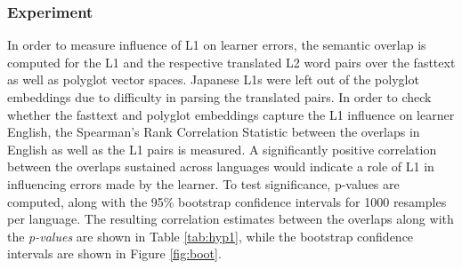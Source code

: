 \documentclass[10pt,letterpaper]{article}
\begin{document}
\subsubsection{Experiment} In order to measure influence of L1 on learner errors, the semantic overlap is computed for the L1 and the respective translated L2 word pairs over the fasttext as well as polyglot vector spaces. Japanese L1s were left out of the polyglot embeddings due to difficulty in parsing the translated pairs. In order to check whether the fasttext and polyglot embeddings capture the L1 influence on learner English, the Spearman's Rank Correlation Statistic between the overlaps in English as well as the L1 pairs is measured. A significantly positive correlation between the overlaps sustained across languages would indicate a role of L1 in influencing errors made by the learner. To test significance, p-values are computed, along with the 95\% bootstrap confidence intervals for 1000 resamples per language. The resulting correlation estimates between the overlaps along with the \textit{p-values} are shown in Table \ref{tab:hyp1}, while the bootstrap confidence intervals are shown in Figure \ref{fig:boot}.
\end{document}

